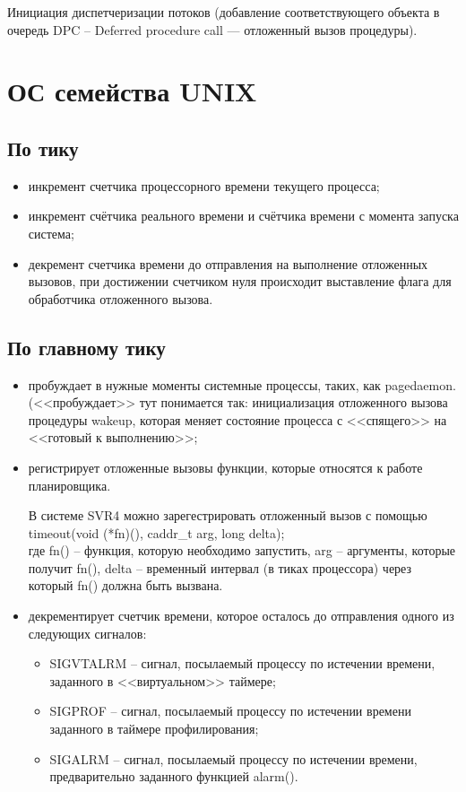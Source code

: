 Инициация диспетчеризации потоков (добавление соответствующего объекта в очередь DPC -- Deferred procedure call — отложенный вызов процедуры).



\section{ОС семейства UNIX} %
\subsection*{По тику}

\begin{itemize}[label=---]
	\item инкремент счетчика процессорного времени текущего процесса; %
	\item инкремент счётчика реального времени  и счётчика времени с момента запуска система;
	\item декремент счетчика времени до отправления на выполнение отложенных вызовов, при достижении счетчиком нуля происходит выставление флага для обработчика отложенного вызова.
\end{itemize}

\subsection*{По главному тику}

\begin{itemize}[label=---]
	\item пробуждает в нужные моменты системные процессы, таких, как pagedaemon. (<<пробуждает>> тут понимается так: инициализация отложенного вызова процедуры wakeup, которая меняет состояние процесса с <<спящего>> на <<готовый к выполнению>>;
	\item регистрирует отложенные вызовы функции, которые относятся к работе планировщика.
	
	В системе SVR4 можно зарегестрировать отложенный вызов с помощью \\ timeout(void (*fn)(), caddr\_t arg, long delta); \\где fn() -- функция, которую необходимо запустить, arg -- аргументы, которые получит fn(), delta -- временный интервал (в тиках процессора) через который fn() должна быть вызвана.
	
	\item декрементирует счетчик времени, которое осталось до отправления одного из следующих сигналов:
	\begin{itemize}
		\item SIGVTALRM – сигнал, посылаемый процессу по истечении времени, заданного в <<виртуальном>> таймере;
		\item SIGPROF – сигнал, посылаемый процессу по истечении времени заданного в таймере профилирования;
		\item SIGALRM – сигнал, посылаемый процессу по истечении времени, предварительно заданного функцией alarm().	
	\end{itemize}
\end{itemize}

